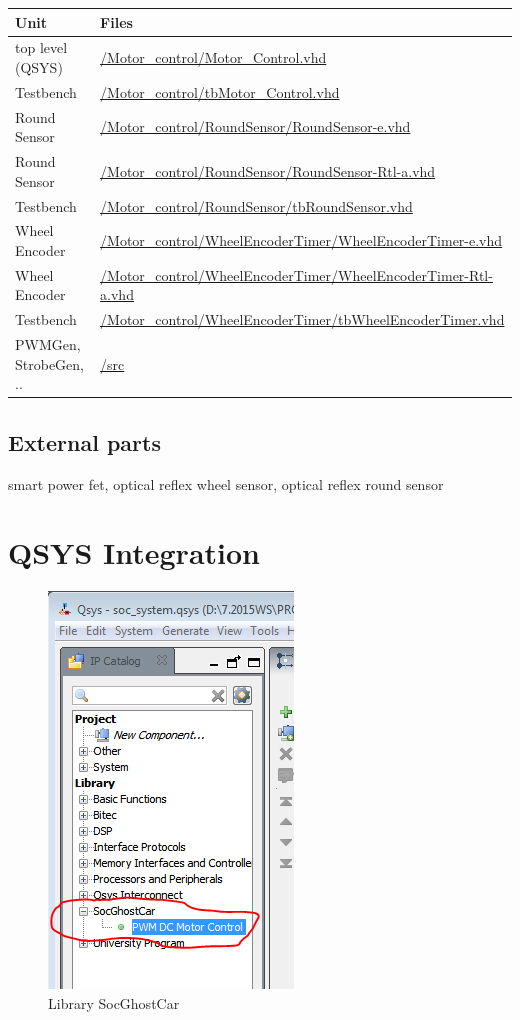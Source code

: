 \documentclass {scrartcl}
\begin{document}
\begin{center}
  \begin{tabular}{ | l | l |}
	  \hline
		\textbf{Unit} & \textbf{Files} \\
		\hline
		top level (QSYS) & \url{/Motor_control/Motor_Control.vhd} \\
		Testbench & \url{/Motor_control/tbMotor_Control.vhd} \\
		\hline
		Round Sensor & \url{/Motor_control/RoundSensor/RoundSensor-e.vhd} \\
		Round Sensor & \url{/Motor_control/RoundSensor/RoundSensor-Rtl-a.vhd} \\
		Testbench & \url{/Motor_control/RoundSensor/tbRoundSensor.vhd} \\
		\hline
		Wheel Encoder & \url{/Motor_control/WheelEncoderTimer/WheelEncoderTimer-e.vhd} \\
		Wheel Encoder & \url{/Motor_control/WheelEncoderTimer/WheelEncoderTimer-Rtl-a.vhd} \\
		Testbench & \url{/Motor_control/WheelEncoderTimer/tbWheelEncoderTimer.vhd} \\
		\hline
		PWMGen, StrobeGen, .. & \url{/src} \\
		\hline
  \end{tabular} 
\end{center}

\subsection{External parts}
smart power fet, optical reflex wheel sensor, optical reflex round sensor


\section{QSYS Integration}
\begin{figure}[h]
	\centering
		\includegraphics{./SocGhostCar_IP.png}
	\caption{Library SocGhostCar}
	\label{fig:SocGhostCar_IP}
\end{figure}
\end{document}
